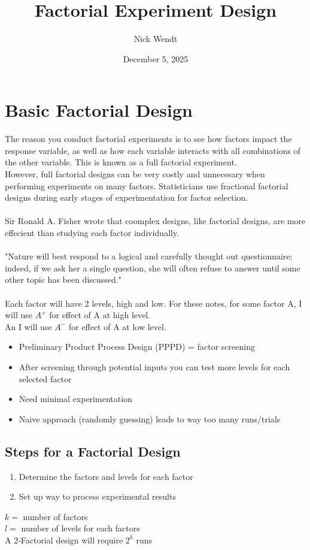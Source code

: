 \documentclass{article}
\title{Factorial Experiment Design}
\author{Nick Wendt}
\date{December 5, 2025}
\begin{document}
\maketitle
\section*{Basic Factorial Design}

The reason you conduct factorial experiments is to see how 
factors impact the response variable, as well as how each variable
interacts with all combinations of the other variable. This is known 
as a full factorial experiment. \\ 

However, full factorial designs can be very costly and unnecesary 
when performing experiments on many factors. Statisticians use fractional 
factorial designs during early stages of experimentation for factor selection.\\  
  \\
Sir Ronald A. Fisher wrote that coomplex designs, like factorial designs, 
are more effecient than studying each factor individually.\\
  \\
"Nature will best respond to a logical and carefully
 thought out questionnaire; indeed, if we ask her a single question, she will often refuse to answer until some other topic has been discussed."\\
   \\
Each factor will have 2 levels, high and low. 
For these notes, for some factor A, I will use $A^{+}$ for 
effect of A at high level.\\
An I will use $A^{-}$ for effect of A at low level.
\begin{itemize}
    \item Preliminary Product Process Design (PPPD) = factor screening
    \item After screening through potential inputs you can test more levels for each selected factor
    \item Need minimal experimentation
    \item Naive approach (randomly guessing) leads to way too many runs/trials
\end{itemize}

\subsection*{Steps for a Factorial Design}
\begin{enumerate}
    \item Determine the factors and levels for each factor
    \item Set up way to process experimental results
\end{enumerate}
$k = $ number of factors\\
$l = $ number of levels for each factors\\
A 2-Factorial design will require $2^{k}$ runs\\
\end{document}
